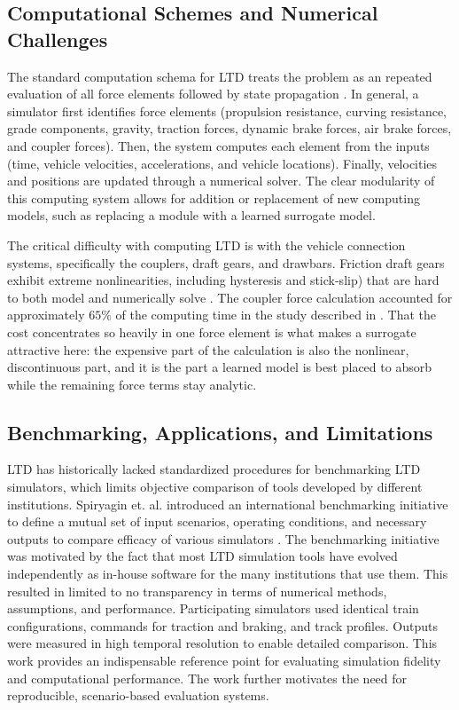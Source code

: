 \subsection{Computational Schemes and Numerical Challenges}

The standard computation schema for LTD treats the problem as an repeated evaluation of all force elements followed by state propagation \cite{Wu2018ComputingSchemesLTD}. In general, a simulator first identifies force elements (propulsion resistance, curving resistance, grade components, gravity, traction forces, dynamic brake forces, air brake forces, and coupler forces). Then, the system computes each element from the inputs (time, vehicle velocities, accelerations, and vehicle locations). Finally, velocities and positions are updated through a numerical solver. The clear modularity of this computing system allows for addition or replacement of new computing models, such as replacing a module with a learned surrogate model. 

The critical difficulty with computing LTD is with the vehicle connection systems, specifically the couplers, draft gears, and drawbars. Friction draft gears exhibit extreme nonlinearities, including hysteresis and stick-slip) that are hard to both model and numerically solve \cite{Wu2016OverviewLTD}. The coupler force calculation accounted for approximately $65\%$ of the computing time in the study described in \cite{Wu2018ComputingSchemesLTD}. That the cost concentrates so heavily in one force element is what makes a surrogate attractive here: the expensive part of the calculation is also the nonlinear, discontinuous part, and it is the part a learned model is best placed to absorb while the remaining force terms stay analytic. 

\subsection{Benchmarking, Applications, and Limitations}

LTD has historically lacked standardized procedures for benchmarking LTD simulators, which limits objective comparison of tools developed by different institutions. Spiryagin et. al. introduced an international benchmarking initiative to define a mutual set of input scenarios, operating conditions, and necessary outputs to compare efficacy of various simulators \cite{Spiryagin2017BenchmarkQuestions}. The benchmarking initiative was motivated by the fact that most LTD simulation tools have evolved independently as in-house software for the many institutions that use them. This resulted in limited to no transparency in terms of numerical methods, assumptions, and performance. Participating simulators used identical train configurations, commands for traction and braking, and track profiles. Outputs were measured in high temporal resolution to enable detailed comparison. This work provides an indispensable reference point for evaluating simulation fidelity and computational performance. The work further motivates the need for reproducible, scenario-based evaluation systems. 

